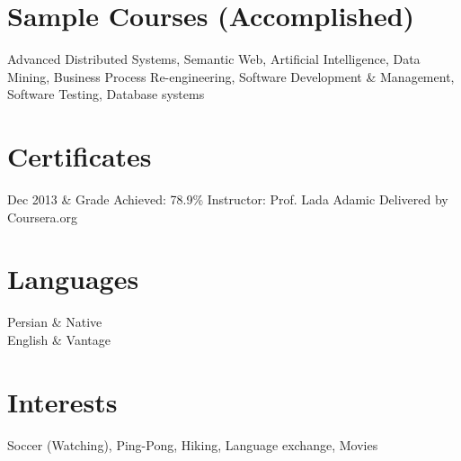 \documentclass[
    changecolor={111, 156, 45}
]{cv-roald}
\begin{document}
\section*{Sample Courses (Accomplished)}

Advanced Distributed Systems, Semantic Web, Artificial Intelligence, Data Mining, Business Process Re-engineering, Software Development \& Management, Software Testing, Database systems

\section*{Certificates}
	\begin{tabularcv}
		Dec 2013 & 
		\newline Grade Achieved: 78.9\%
		\newline Instructor: Prof. Lada Adamic
		\newline Delivered by Coursera.org
	\end{tabularcv}

\section*{Languages}
\begin{tabularcv}
Persian     &	Native \\
English     &  	Vantage \\
\end{tabularcv}

\section*{Interests}
Soccer (Watching), Ping-Pong, Hiking, Language exchange, Movies
    
\end{document}
